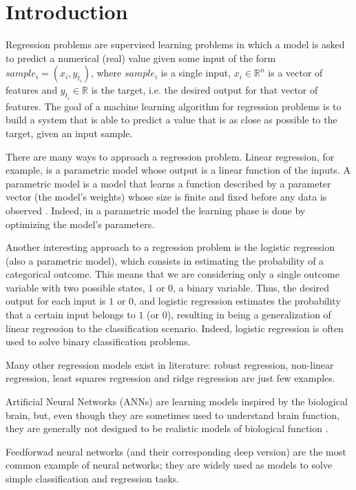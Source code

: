 \documentclass[10pt,journal,A4paper,compsoc,epsfig]{IEEEtran}
\begin{document}
\section{Introduction}
\label{sec:introduction}

Regression problems are supervised learning problems in which a model is asked to predict a numerical (real) value given some input of the form $sample_i = (x_i, y_{t_i})$, where $sample_i$ is a single input, $x_i \in \mathbb{R}^n$ is a vector of features and $y_{t_i} \in \mathbb{R}$ is the target, i.e. the desired output for that vector of features.
The goal of a machine learning algorithm for regression problems is to build a system that is able to predict a value that is as close as possible to the target, given an input sample.

There are many ways to approach a regression problem.
Linear regression, for example, is a parametric model whose output is a linear function of the inputs. A parametric model is a model that learns a function described by a parameter vector (the model's weights) whose size is finite and fixed before any data is observed \cite{lecun2015deep}. Indeed, in a parametric model the learning phase is done by optimizing the model's parameters.

Another interesting approach to a regression problem is the logistic regression (also a parametric model), which consists in estimating the probability of a categorical outcome. This means that we are considering only a single outcome variable with two possible states, $1$ or $0$, a binary variable. Thus, the desired output for each input is $1$ or $0$, and logistic regression estimates the probability that a certain input belongs to $1$ (or $0$), resulting in being a generalization of linear regression to the classification scenario. Indeed, logistic regression is often used to solve binary classification problems.

Many other regression models exist in literature: robust regression, non-linear regression, least squares regression and ridge regression are just few examples.

Artificial Neural Networks (ANNs) are learning models inspired by the biological brain, but, even though they are sometimes used to understand brain function, they are generally not designed to be realistic models of biological function \cite{lecun2015deep}.

Feedforwad neural networks (and their corresponding deep version) are the most common example of neural networks; they are widely used as models to solve simple classification and regression tasks.
\end{document}

